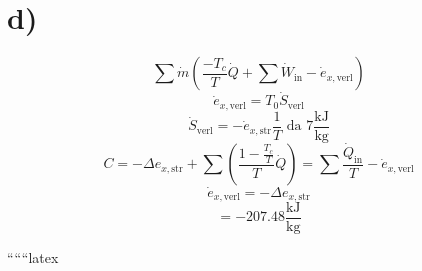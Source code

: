 

\section*{d)}

\[
\sum \dot{m} \left( \frac{-T_c}{T} \dot{Q} + \sum \dot{W}_{\text{in}} - \dot{e}_{x, \text{verl}} \right)
\]
\[
\dot{e}_{x, \text{verl}} = T_0 \dot{S}_{\text{verl}}
\]
\[
\dot{S}_{\text{verl}} = -\dot{e}_{x, \text{str}} \frac{1}{T} \text{ da } 7 \frac{\text{kJ}}{\text{kg}}
\]
\[
C = -\Delta e_{x, \text{str}} + \sum \left( \frac{1 - \frac{T_c}{T}}{T} \dot{Q} \right) = \sum \frac{\dot{Q}_{\text{in}}}{T} - \dot{e}_{x, \text{verl}}
\]
\[
\dot{e}_{x, \text{verl}} = -\Delta e_{x, \text{str}}
\]
\[
= -207.48 \frac{\text{kJ}}{\text{kg}}
\]

``````latex
